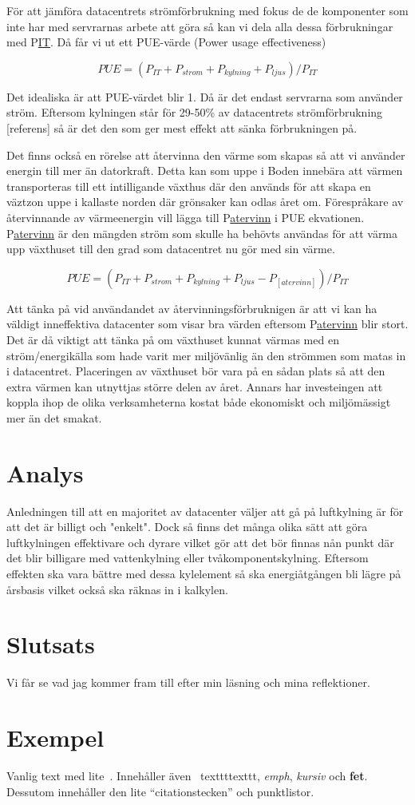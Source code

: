\documentclass[conference,a4paper]{IEEEtran}
\begin{document}
För att jämföra datacentrets strömförbrukning med fokus de de komponenter som inte har med servrarnas arbete
att göra så kan vi dela alla dessa förbrukningar med P\underline{IT}. Då får vi ut ett PUE-värde (Power usage effectiveness) \cite{modelling1}

\[PUE = (P_{IT} + P_{strom} + P_{kylning} + P_{ljus}) / P_{IT} \]

Det idealiska är att PUE-värdet blir 1. Då är det endast servrarna som använder ström. Eftersom kylningen står för 29-50\%
av datacentrets strömförbrukning [referens] så är det den som ger mest effekt att sänka förbrukningen på.  

Det finns också en rörelse att återvinna den värme som skapas så att vi använder energin till mer än datorkraft. 
Detta kan som uppe i Boden innebära att värmen transporteras till ett intilligande växthus där den används för 
att skapa en väztzon uppe i kallaste norden där grönsaker kan odlas året om. Förespråkare av återvinnande av 
värmeenergin vill lägga till P\underline{atervinn} i PUE ekvationen. P\underline{atervinn} är den mängden ström 
som skulle ha behövts användas för att värma upp växthuset till den grad som datacentret nu gör med sin värme.

\[PUE = (P_{IT} + P_{strom} + P_{kylning} + P_{ljus} - P_[atervinn]) / P_{IT} \]

Att tänka på vid användandet av återvinningsförbruknigen är att vi kan ha väldigt inneffektiva datacenter som visar
bra värden eftersom P\underline{atervinn} blir stort.  Det är då viktigt att tänka på om växthuset kunnat värmas med 
en ström/energikälla som hade varit mer miljövänlig än den strömmen som matas in i datacentret. Placeringen av växthuset
bör vara på en sådan plats så att den extra värmen kan utnyttjas större delen av året. Annars har investeingen att koppla
ihop de olika verksamheterna kostat både ekonomiskt och miljömässigt mer än det smakat. 

\section{Analys}
Anledningen till att en majoritet av datacenter väljer att gå på luftkylning är för att det är billigt och 
"enkelt". Dock så finns det många olika sätt att göra luftkylningen effektivare och dyrare vilket gör att det 
bör finnas nån punkt där det blir billigare med vattenkylning eller tvåkomponentskylning. Eftersom effekten ska
vara bättre med dessa kylelement så ska energiåtgången bli lägre på årsbasis vilket också ska räknas in i kalkylen. 
\section{Slutsats}
Vi får se vad jag kommer fram till efter min läsning och mina reflektioner. 
\section{Exempel}
Vanlig text med lite~\cite{energy3}. Innehåller även \
texttt{texttt}, \emph{emph}, \textit{kursiv} och \textbf{fet}. Dessutom innehåller
den lite ``citationstecken'' och punktlistor.

\printbibliography
\end{document}
